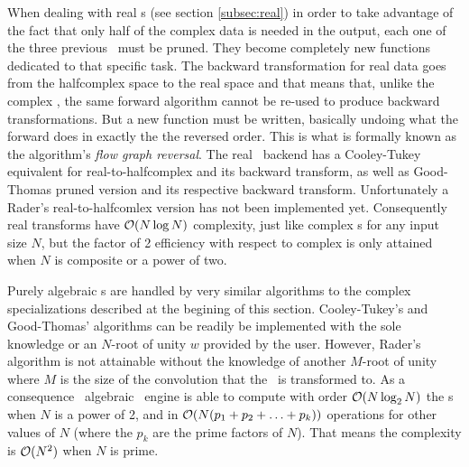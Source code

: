 When dealing with real \dft s (see section \ref{subsec:real}) in order to take
advantage of the fact that only half of the complex data is needed in the
output, each one of the three previous \fft\ must be pruned. They become
completely new functions dedicated to that specific task.
The backward transformation for real data goes from the halfcomplex space
to the real space and that means that, unlike the complex \dft, the same forward
algorithm cannot be re-used to produce backward transformations. But a new
function must be written, basically undoing what the forward does in exactly the
the reversed order. This is what is formally known as the algorithm's 
\emph{flow graph reversal}. The real \bsl\ backend has a Cooley-Tukey equivalent
for real-to-halfcomplex and its backward transform, as well as Good-Thomas
pruned version and its respective backward transform. Unfortunately a Rader's
real-to-halfcomlex version has not been implemented yet. Consequently
real transforms have $\mathcal{O}(N \log N)$ complexity, just like complex \dft s for
any input size $N$, but the factor of 2 efficiency with respect to
complex is only attained when $N$ is composite or a power of two.

Purely algebraic \dft s are handled by very similar algorithms to the complex
specializations described at the begining of this section. Cooley-Tukey's and
Good-Thomas' algorithms can be readily be implemented with the sole knowledge or
an $N$-root of unity $w$ provided by the user. However, Rader's algorithm is not
attainable without the knowledge of another $M$-root of unity where $M$ is the
size of the convolution that the \dft\ is transformed to. As a consequence \bsl\
algebraic \dft\ engine is able to compute with order $\mathcal{O}(N \log_2 N)$ the
\dft s when $N$ is a power of 2, and 
in $\mathcal{O}(N (p_1 + p_2 + \ldots + p_k) )$ operations for other values of $N$
(where the $p_k$ are the prime factors of $N$). That means the complexity is 
$\mathcal{O}(N^2)$ when $N$ is prime.

